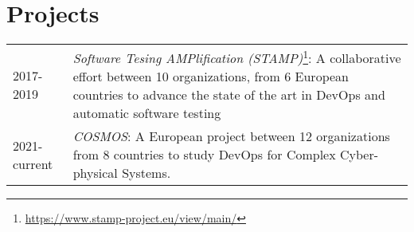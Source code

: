 \section*{Projects}

\begin{longtable}{p{} p{}}
2017-2019 & \textit{Software Tesing AMPlification (STAMP)}\footnote{\url{https://www.stamp-project.eu/view/main/}}: A collaborative effort between 10 organizations, from 6 European countries to advance the state of the art in DevOps and automatic software testing \\
2021-current & \textit{COSMOS}: A European project between 12 organizations from 8 countries to study DevOps for Complex Cyber-physical Systems.
\end{longtable}
